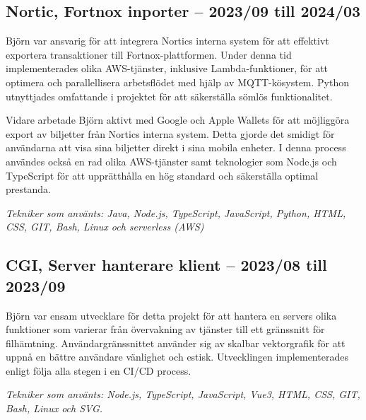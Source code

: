\subsection*{\textcolor{colorTitelErfarenhet}{Nortic, Fortnox inporter – 2023/09 till 2024/03}}
Björn var ansvarig för att integrera Nortics interna system för att effektivt exportera transaktioner till Fortnox-plattformen. 
Under denna tid implementerades olika AWS-tjänster, inklusive Lambda-funktioner, för att optimera och parallellisera arbetsflödet med hjälp av MQTT-kösystem. 
Python utnyttjades omfattande i projektet för att säkerställa sömlös funktionalitet.

Vidare arbetade Björn aktivt med Google och Apple Wallets för att möjliggöra export av biljetter från Nortics interna system. 
Detta gjorde det smidigt för användarna att visa sina biljetter direkt i sina mobila enheter. 
I denna process användes också en rad olika AWS-tjänster samt teknologier som Node.js och TypeScript för att upprätthålla en hög standard och säkerställa optimal prestanda.

\vspace{5pt}\textit{Tekniker som använts: Java, Node.js, TypeScript, JavaScript, Python, HTML, CSS, GIT, Bash, Linux och serverless (AWS)}

\vspace{15pt} %
\subsection*{\textcolor{colorTitelErfarenhet}{CGI, Server hanterare klient – 2023/08 till 2023/09}}
Björn var ensam utvecklare för detta projekt för att hantera en servers olika funktioner som 
varierar från övervakning av tjänster till ett gränssnitt för filhämtning. Användargränssnittet 
använder sig av skalbar vektorgrafik för att uppnå en bättre användare vänlighet och estisk. 
Utvecklingen implementerades enligt följa alla stegen i en CI/CD process. 

\vspace{5pt}\textit{Tekniker som använts: Node.js, TypeScript, JavaScript, Vue3, HTML, CSS, GIT, Bash, Linux och SVG.}

